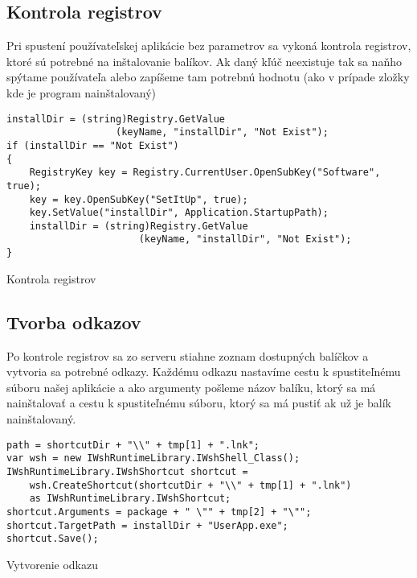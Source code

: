 \subsection{Kontrola registrov}
Pri spustení používateľskej aplikácie bez parametrov sa vykoná kontrola registrov, ktoré sú potrebné na inštalovanie balíkov. Ak daný kľúč neexistuje tak sa naňho spýtame používateľa alebo zapíšeme tam potrebnú hodnotu (ako v prípade zložky kde je program nainštalovaný)

\begin{listing}
\begin{verbatim}
installDir = (string)Registry.GetValue
                   (keyName, "installDir", "Not Exist");
if (installDir == "Not Exist")
{
    RegistryKey key = Registry.CurrentUser.OpenSubKey("Software", true);
    key = key.OpenSubKey("SetItUp", true);
    key.SetValue("installDir", Application.StartupPath);
    installDir = (string)Registry.GetValue
                       (keyName, "installDir", "Not Exist");
}      
\end{verbatim}
\caption{Kontrola registrov}
\label{lst:regcheck}
\end{listing}

\subsection{Tvorba odkazov}
Po kontrole registrov sa zo serveru stiahne zoznam dostupných balíčkov a vytvoria sa potrebné odkazy. Každému odkazu nastavíme cestu k spustiteľnému súboru našej aplikácie a ako argumenty pošleme názov balíku, ktorý sa má nainštalovať a cestu k spustiteľnému súboru, ktorý sa má pustiť ak už je balík nainštalovaný.

\begin{listing}
\begin{verbatim}
path = shortcutDir + "\\" + tmp[1] + ".lnk";
var wsh = new IWshRuntimeLibrary.IWshShell_Class();
IWshRuntimeLibrary.IWshShortcut shortcut = 
    wsh.CreateShortcut(shortcutDir + "\\" + tmp[1] + ".lnk")
    as IWshRuntimeLibrary.IWshShortcut;
shortcut.Arguments = package + " \"" + tmp[2] + "\"";
shortcut.TargetPath = installDir + "UserApp.exe";
shortcut.Save();
\end{verbatim}
\caption{Vytvorenie odkazu}
\label{lst:shortcut}
\end{listing}

